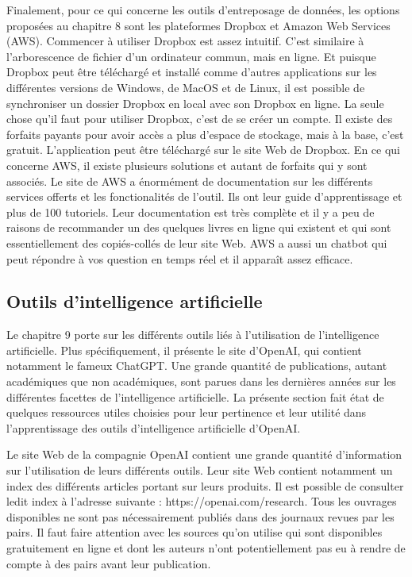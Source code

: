 \documentclass[
  letterpaper,
  DIV=11,
  numbers=noendperiod]{scrreprt}
\begin{document}
Finalement, pour ce qui concerne les outils d'entreposage de données,
les options proposées au chapitre 8 sont les plateformes Dropbox et
Amazon Web Services (AWS). Commencer à utiliser Dropbox est assez
intuitif. C'est similaire à l'arborescence de fichier d'un ordinateur
commun, mais en ligne. Et puisque Dropbox peut être téléchargé et
installé comme d'autres applications sur les différentes versions de
Windows, de MacOS et de Linux, il est possible de synchroniser un
dossier Dropbox en local avec son Dropbox en ligne. La seule chose qu'il
faut pour utiliser Dropbox, c'est de se créer un compte. Il existe des
forfaits payants pour avoir accès a plus d'espace de stockage, mais à la
base, c'est gratuit. L'application peut être téléchargé sur le site Web
de Dropbox. En ce qui concerne AWS, il existe plusieurs solutions et
autant de forfaits qui y sont associés. Le site de AWS a énormément de
documentation sur les différents services offerts et les fonctionalités
de l'outil. Ils ont leur guide d'apprentissage et plus de 100 tutoriels.
Leur documentation est très complète et il y a peu de raisons de
recommander un des quelques livres en ligne qui existent et qui sont
essentiellement des copiés-collés de leur site Web. AWS a aussi un
chatbot qui peut répondre à vos question en temps réel et il apparaît
assez efficace.

\subsection{Outils d'intelligence
artificielle}\label{outils-dintelligence-artificielle}

Le chapitre 9 porte sur les différents outils liés à l'utilisation de
l'intelligence artificielle. Plus spécifiquement, il présente le site
d'OpenAI, qui contient notamment le fameux ChatGPT. Une grande quantité
de publications, autant académiques que non académiques, sont parues
dans les dernières années sur les différentes facettes de l'intelligence
artificielle. La présente section fait état de quelques ressources
utiles choisies pour leur pertinence et leur utilité dans
l'apprentissage des outils d'intelligence artificielle d'OpenAI.

Le site Web de la compagnie OpenAI contient une grande quantité
d'information sur l'utilisation de leurs différents outils. Leur site
Web contient notamment un index des différents articles portant sur
leurs produits. Il est possible de consulter ledit index à l'adresse
suivante : https://openai.com/research. Tous les ouvrages disponibles ne
sont pas nécessairement publiés dans des journaux revues par les pairs.
Il faut faire attention avec les sources qu'on utilise qui sont
disponibles gratuitement en ligne et dont les auteurs n'ont
potentiellement pas eu à rendre de compte à des pairs avant leur
publication.
\end{document}
